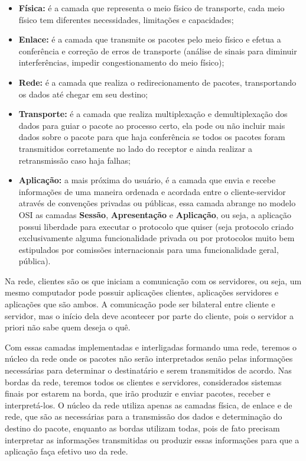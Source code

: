 \documentclass[brazilian,a4paper,twocolumn]{article}
\begin{document}
\begin{itemize}
    \item{\textbf{Física:} é a camada que representa o meio físico de transporte, cada meio físico tem diferentes necessidades, limitações e capacidades;}
    \item{\textbf{Enlace:} é a camada que transmite os pacotes pelo meio físico e efetua a conferência e correção de erros de transporte (análise de sinais para diminuir interferências, impedir congestionamento do meio físico);}
    \item{\textbf{Rede:} é a camada que realiza o redirecionamento de pacotes, transportando os dados até chegar em seu destino;}
    \item{\textbf{Transporte:} é a camada que realiza multiplexação e demultiplexação dos dados para guiar o pacote ao processo certo, ela pode ou não incluir mais dados sobre o pacote para que haja conferência se todos os pacotes foram transmitidos corretamente no lado do receptor e ainda realizar a retransmissão caso haja falhas;}
    \item{\textbf{Aplicação:} a mais próxima do usuário, é a camada que envia e recebe informações de uma maneira ordenada e acordada entre o cliente-servidor através de convenções privadas ou públicas, essa camada abrange no modelo OSI as camadas \textbf{Sessão}, \textbf{Apresentação} e \textbf{Aplicação}, ou seja, a aplicação possui liberdade para executar o protocolo que quiser (seja protocolo criado exclusivamente alguma funcionalidade privada ou por protocolos muito bem estipulados por comissões internacionais para uma funcionalidade geral, pública).}
\end{itemize}

Na rede, clientes são os que iniciam a comunicação com os servidores, ou seja, um mesmo computador pode possuir aplicações clientes, aplicações servidores e aplicações que são ambos. A comunicação pode ser bilateral entre cliente e servidor, mas o início dela deve acontecer por parte do cliente, pois o servidor a priori não sabe quem deseja o quê.

Com essas camadas implementadas e interligadas formando uma rede, teremos o núcleo da rede onde os pacotes não serão interpretados senão pelas informações necessárias para determinar o destinatário e serem transmitidos de acordo. Nas bordas da rede, teremos todos os clientes e servidores, considerados sistemas finais por estarem na borda, que irão produzir e enviar pacotes, receber e interpretá-los. O núcleo da rede utiliza apenas as camadas física, de enlace e de rede, que são as necessárias para a transmissão dos dados e determinação do destino do pacote, enquanto as bordas utilizam todas, pois de fato precisam interpretar as informações transmitidas ou produzir essas informações para que a aplicação faça efetivo uso da rede.
\end{document}
